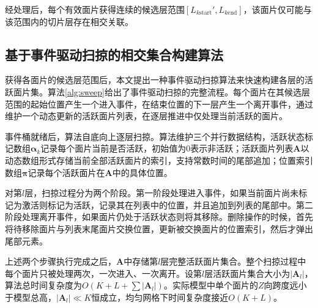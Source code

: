 经处理后，每个有效面片获得连续的候选层范围$[L_{k\mathrm{start}}',L_{k\mathrm{end}}]$，该面片仅可能与该范围内的切片层存在相交关联。

\subsection{基于事件驱动扫掠的相交集合构建算法}

获得各面片的候选层范围后，本文提出一种事件驱动扫掠算法来快速构建各层的活跃面片集。算法\ref{alg:sweep}给出了事件驱动扫掠的完整流程。每个面片在其候选层范围的起始位置产生一个进入事件，在结束位置的下一层产生一个离开事件，通过维护一个动态更新的活跃面片列表，在逐层推进中仅处理当前活跃的面片。

事件桶就绪后，算法自底向上逐层扫掠。算法维护三个并行数据结构，活跃状态标记数组$\bm{\alpha}_{k}$记录每个面片当前是否活跃，初始值为0表示非活跃；活跃面片列表$\bm{A}$以动态数组形式存储当前全部活跃面片的索引，支持常数时间的尾部追加；位置索引数组$\bm{\pi}$记录每个活跃面片在$\bm{A}$中的具体位置。

对第$l$层，扫掠过程分为两个阶段。第一阶段处理进入事件，如果当前面片尚未标记为激活则标记为活跃，记录其在列表中的位置，并且追加到列表的尾部中。第二阶段处理离开事件，如果面片仍处于活跃状态则将其移除。删除操作的时候，首先将待移除面片与列表末尾面片交换位置，更新被交换面片的位置索引，然后才弹出尾部元素。

上述两个步骤执行完成之后，$\bm{A}$中存储第$l$层完整活跃面片集合。整个扫掠过程中每个面片只被处理两次，一次进入、一次离开。设第$l$层活跃面片集合大小为$|\bm{A}_{l}|$，算法总时间复杂度为$O(K+L+\sum|\bm{A}_{l}|)$。实际模型中单个面片的$Z$向跨度远小于模型总高，$|\bm{A}_{l}|\ll K$恒成立，均匀网格下时间复杂度接近$O(K+L)$。

